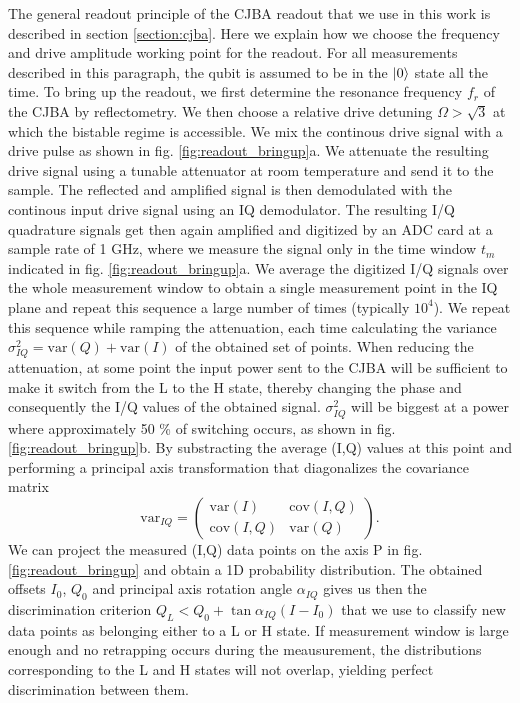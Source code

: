 The general readout principle of the CJBA readout that we use in this work is described in section \ref{section:cjba}. Here we explain how we choose the frequency and drive amplitude working point for the readout. For all measurements described in this paragraph, the qubit is assumed to be in the $\left| 0 \right>$ state all the time. To bring up the readout, we first determine the resonance frequency $f_r$ of the CJBA by reflectometry. We then choose a relative drive detuning $\Omega>\sqrt{3}$ at which the bistable regime is accessible. We mix the continous drive signal with a drive pulse as shown in fig. \ref{fig:readout_bringup}a. We attenuate the resulting drive signal using a tunable attenuator at room temperature and send it to the sample. The reflected and amplified signal is then demodulated with the continous input drive signal using an IQ demodulator. The resulting I/Q quadrature signals get then again amplified and digitized by an ADC card at a sample rate of 1 GHz, where we measure the signal only in the time window $t_m$ indicated in fig. \ref{fig:readout_bringup}a. We average the digitized I/Q signals over the whole measurement window to obtain a single measurement point in the IQ plane and repeat this sequence a large number of times (typically $10^4$). We repeat this sequence while ramping the attenuation, each time calculating the variance $\sigma_{IQ}^2=\mathrm{var}(Q)+\mathrm{var}(I)$ of the obtained set of points. When reducing the attenuation, at some point the input power sent to the CJBA will be sufficient to make it switch from the L to the H state, thereby changing the phase and consequently the I/Q values of the obtained signal. $\sigma_{IQ}^2$ will be biggest at a power where approximately 50 \% of switching occurs, as shown in fig. \ref{fig:readout_bringup}b. By substracting the average (I,Q) values at this point and performing a principal axis transformation that diagonalizes the covariance matrix
%
\begin{equation}
\mathrm{var}_{IQ} = \left(\begin{array}{cc}\mathrm{var}(I) & \mathrm{cov}(I,Q) \\ \mathrm{cov}(I,Q) & \mathrm{var}(Q) \end{array}\right).
\end{equation}
%
We can project the measured (I,Q) data points on the axis P in fig. \ref{fig:readout_bringup} and obtain a 1D probability distribution. The obtained offsets $I_0$, $Q_0$ and principal axis rotation angle $\alpha_{IQ}$ gives us then the discrimination criterion $Q_L<Q_0+\tan{\alpha_{IQ}}(I-I_0)$ that we use to classify new data points as belonging either to a L or H state. If measurement window is large enough and no retrapping occurs during the meausurement, the distributions corresponding to the L and H states will not overlap, yielding perfect discrimination between them.

